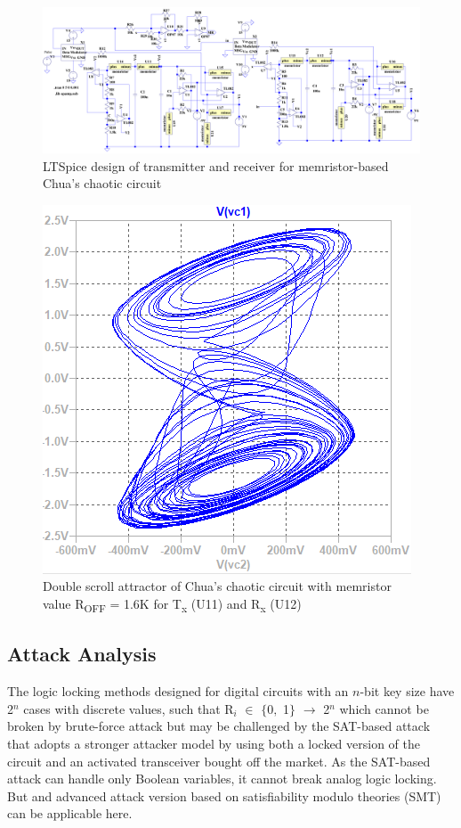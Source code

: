 \begin{figure}[]
    \centering
    \includegraphics[width = 1\linewidth]{figs/Fig10Tx_Rx_LTSpice.PNG}
    \caption{LTSpice design of transmitter and receiver for memristor-based Chua's chaotic circuit}
     \label{fig:7}
\end{figure}

\begin{figure}[!b]
    \centering
    \includegraphics[width = 0.65\linewidth]{figs/Fig11double scroll attractor.PNG}
    \caption{Double scroll attractor of Chua's chaotic circuit with memristor value R\textsubscript{OFF} = 1.6K for T\textsubscript{x} (U11) and R\textsubscript{x} (U12) }
     \label{fig:8}
\end{figure}

\subsection*{Attack Analysis}
The logic locking methods designed for digital circuits with an $n$-bit key size have 2$^n$ cases with discrete values, such that R$_{i}$ $\in$ $\{0,$ 1$\}$ $\rightarrow$ 2$^n$ which cannot be broken by brute-force attack but may be challenged by the SAT-based attack \cite{7140252} that adopts a stronger attacker model by using both a locked version of the circuit and an activated transceiver bought off the market. As the SAT-based attack can handle only Boolean variables, it cannot break analog logic locking. But and advanced attack version based on satisfiability modulo theories (SMT) \cite{9000113} can be applicable here.

